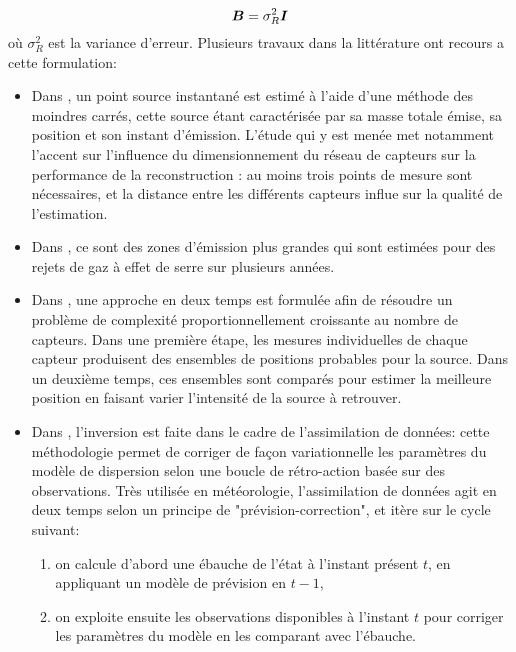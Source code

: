 	\begin{equation}
	{
		{\bm{B}}= \sigma_R^2 {\bm{I}}}
	\end{equation}
{où $\sigma_R^2$ est la variance d'erreur.} Plusieurs travaux dans la littérature ont recours a cette formulation: \\
\begin{itemize}
	\item Dans \cite{Kathirgamanathan2002}, un point source instantané est estimé à l'aide d'une méthode des moindres carrés, cette source étant caractérisée par sa masse totale émise, sa position et son instant d'émission. L'étude qui y est menée met notamment l'accent sur l'influence du dimensionnement du réseau de capteurs sur la performance de la reconstruction : au moins trois points de mesure sont nécessaires, et la distance entre les différents capteurs influe sur la qualité de l'estimation.\\
	
	\item Dans \cite{Ryall2001}, ce sont des zones d'émission plus grandes qui sont estimées pour des rejets de gaz à effet de serre sur plusieurs années. \\
	
	\item Dans \cite{Matthes2005}, une approche en deux temps est formulée afin de résoudre un problème de complexité proportionnellement croissante au nombre de capteurs. Dans une première étape, les mesures individuelles de chaque capteur produisent des ensembles de positions probables pour la source. Dans un deuxième temps, ces ensembles sont comparés pour estimer la meilleure position en faisant varier l'intensité de la source à retrouver. \\
	
	\item  Dans \cite{Robertson1998}, l'inversion est faite dans le cadre de l'assimilation de données: cette méthodologie permet de corriger de façon variationnelle les paramètres du modèle de dispersion selon une boucle de rétro-action basée sur des observations. Très utilisée en météorologie, l'assimilation de données agit en deux temps selon un principe de "prévision-correction", et itère sur le cycle suivant:
	\begin{enumerate}
		\item  on calcule d'abord une ébauche de l'état à l'instant présent $t$, en appliquant un modèle de prévision en $t-1$,
		\item  on exploite ensuite les observations disponibles à l'instant $t$ pour corriger les paramètres du modèle en les comparant avec l'ébauche. \\
	\end{enumerate}
	

\end{itemize}
